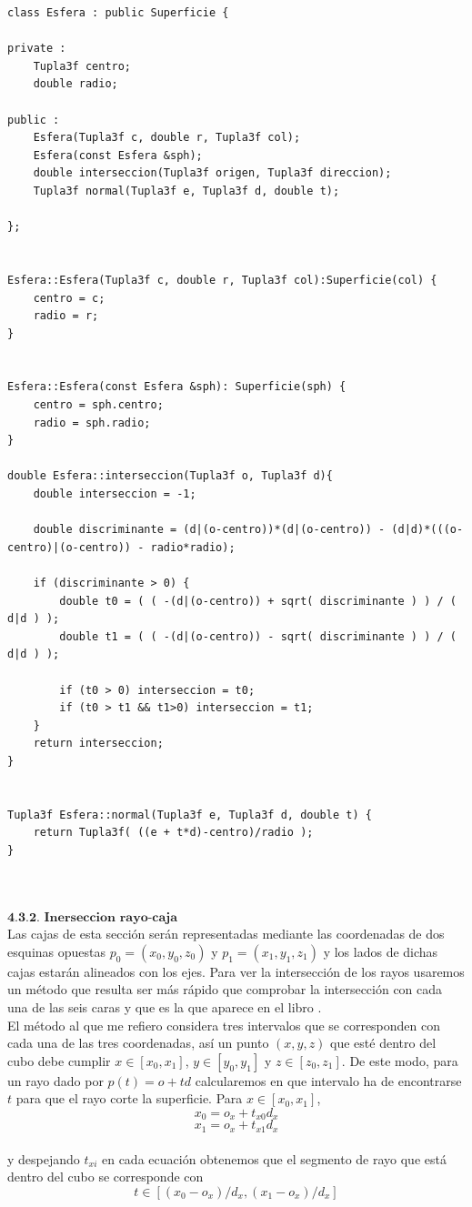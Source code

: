 \begin{lstlisting}[style=Consola]
class Esfera : public Superficie {

private :
	Tupla3f centro;
	double radio;

public :
	Esfera(Tupla3f c, double r, Tupla3f col);
	Esfera(const Esfera &sph);
	double interseccion(Tupla3f origen, Tupla3f direccion);
	Tupla3f normal(Tupla3f e, Tupla3f d, double t);

};


Esfera::Esfera(Tupla3f c, double r, Tupla3f col):Superficie(col) {
	centro = c;
	radio = r;
}


Esfera::Esfera(const Esfera &sph): Superficie(sph) {
	centro = sph.centro;
	radio = sph.radio;
}

double Esfera::interseccion(Tupla3f o, Tupla3f d){
	double interseccion = -1;

	double discriminante = (d|(o-centro))*(d|(o-centro)) - (d|d)*(((o-centro)|(o-centro)) - radio*radio);

	if (discriminante > 0) {
		double t0 = ( ( -(d|(o-centro)) + sqrt( discriminante ) ) / ( d|d ) );
		double t1 = ( ( -(d|(o-centro)) - sqrt( discriminante ) ) / ( d|d ) );

		if (t0 > 0) interseccion = t0;
		if (t0 > t1 && t1>0) interseccion = t1;
	}
	return interseccion;
}


Tupla3f Esfera::normal(Tupla3f e, Tupla3f d, double t) {
	return Tupla3f( ((e + t*d)-centro)/radio );
}
\end{lstlisting}
${ }$\\

${ }$\\
$\textbf{4.3.2. Inerseccion rayo-caja}$
${ }$\\

Las cajas de esta sección serán representadas mediante las coordenadas de dos esquinas opuestas $p_0 = (x_0, y_0, z_0)$ y $p_1 = (x_1, y_1, z_1)$ y los lados de dichas cajas estarán alineados con los ejes. Para ver la intersección de los rayos usaremos un método que resulta ser más rápido que comprobar la intersección con cada una de las seis caras y que es la que aparece en el libro \cite{Shirley}.
	${ }$\\	
	
El método al que me refiero considera tres intervalos que se corresponden con cada una de las tres coordenadas, así un punto $(x, y, z)$ que esté dentro del cubo debe cumplir $x \in [x_0, x_1]$, $y \in [y_0, y_1]$ y $z \in [z_0, z_1]$. De este modo, para un rayo dado por $p(t) = o + td$ calcularemos en que intervalo ha de encontrarse $t$ para que el rayo corte la superficie. Para $x \in [x_0, x_1]$,
${ }$\\
\[
	x_0 = o_x + t_{x0}d_x
\]
\[
	x_1 = o_x + t_{x1}d_x
\]
${ }$\\
y despejando $t_{xi}$ en cada ecuación obtenemos que el segmento de rayo que está dentro del cubo se corresponde con
${ }$\\
\[
	t \in [(x_0-o_x)/d_x, (x_1-o_x)/d_x]
\]
${ }$\\

